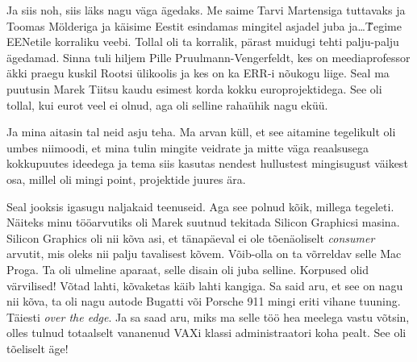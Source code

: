 Ja siis noh, siis läks  nagu väga ägedaks. Me saime Tarvi 
Martensiga tuttavaks ja Toomas 
Mölderiga ja käisime Eestit esindamas mingitel 
asjadel juba ja\ldots\~ Tegime EENetile korraliku veebi. Tollal oli ta korralik, 
pärast muidugi tehti palju-palju ägedamad. Sinna tuli hiljem Pille 
Pruulmann-Vengerfeldt, kes on 
meediaprofessor äkki praegu kuskil Rootsi ülikoolis ja kes on ka 
ERR-i nõukogu 
liige. Seal ma puutusin Marek Tiitsu kaudu esimest 
korda kokku europrojektidega. See oli tollal, kui eurot veel ei olnud, aga oli 
selline rahaühik nagu eküü. 


Ja mina aitasin tal neid asju teha. Ma arvan küll, et see aitamine tegelikult 
oli  umbes niimoodi, et mina tulin mingite veidrate ja mitte väga reaalsusega 
kokkupuutes ideedega ja tema siis  kasutas nendest hullustest 
mingisugust väikest osa, millel oli mingi point, projektide juures ära.


Seal jooksis igasugu naljakaid teenuseid. Aga see polnud kõik, millega tegeleti. 
Näiteks minu tööarvutiks oli Marek suutnud tekitada  Silicon 
Graphicsi masina. Silicon Graphics oli nii kõva asi, et tänapäeval 
ei ole tõenäoliselt \emph{consumer} arvutit, mis oleks nii palju tavalisest 
kõvem. Võib-olla on ta võrreldav selle Mac Proga. Ta oli ulmeline aparaat, 
selle disain oli juba selline. Korpused olid värvilised! Võtad lahti, kõvaketas 
käib lahti kangiga. Sa said aru, et see on nagu nii kõva, ta oli nagu autode 
Bugatti või Porsche 911  mingi eriti vihane tuuning. Täiesti \emph{over the 
edge}. Ja sa saad aru, miks ma selle töö hea meelega vastu võtsin, olles tulnud  
totaalselt vananenud VAXi klassi administraatori koha pealt. See oli tõeliselt 
äge!

